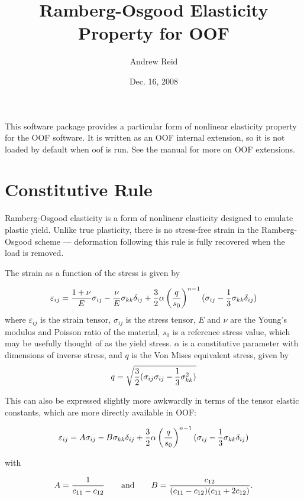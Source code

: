 \documentclass[10pt]{article}
\begin{document}
\title{Ramberg-Osgood Elasticity Property for OOF}
\author{Andrew Reid}
\date{Dec. 16, 2008}
\maketitle

This software package provides a particular form of nonlinear
elasticity property for the OOF software.  It is written as an OOF
internal extension, so it is not loaded by default when oof is run.
See the manual for more on OOF extensions.

\section{Constitutive Rule}

Ramberg-Osgood elasticity is a form of nonlinear elasticity designed
to emulate plastic yield.  Unlike true plasticity, there is no
stress-free strain in the Ramberg-Osgood scheme --- deformation
following this rule is fully recovered when the load is removed.

The strain as a function of the stress is given by

\begin{equation}
\varepsilon_{ij}={1+\nu \over E}\sigma_{ij}-
	  {\nu \over E}\sigma_{kk}\delta_{ij}+
          {{3 \over 2} \alpha}\left({q \over s_0}\right)^{n-1}
	    (\sigma_{ij}-{1 \over 3}\sigma_{kk}\delta_{ij})
\label{eqn:base} 
\end{equation}
where $\varepsilon_{ij}$ is the strain tensor, $\sigma_{ij}$ is the
stress tensor, $E$ and $\nu$ are the Young's modulus and Poisson ratio
of the material, $s_0$ is a reference stress value, which may be
usefully thought of as the yield stress.  $\alpha$ is a constitutive
parameter with dimensions of inverse stress, and $q$ is the Von Mises
equivalent stress, given by
\[
q=\sqrt{{3 \over 2}(\sigma_{ij}\sigma_{ij}-{1 \over 3}\sigma_{kk}^2)}
\]

This can also be expressed slightly more awkwardly in terms of the
tensor elastic constants, which are more directly available in OOF:

\begin{equation}
\varepsilon_{ij}=A\sigma_{ij}-
	  B\sigma_{kk}\delta_{ij}+ 
          {{3 \over 2} \alpha}\left({q \over s_0}\right)^{n-1}
	  (\sigma_{ij}-{1 \over 3}\sigma_{kk}\delta_{ij})
\label{eqn:rule}
\end{equation}

with

\begin{equation}
A={1 \over c_{11}-c_{12}} \qquad\mathrm{and}\qquad 
B={c_{12} \over (c_{11}-c_{12})(c_{11}+2c_{12})}.
\end{equation}
\end{document}
